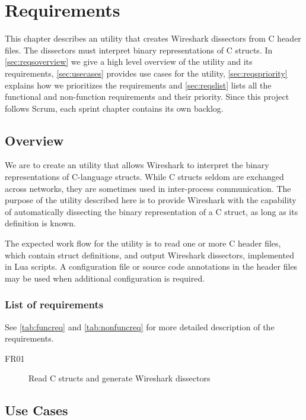 \chapter{Requirements}
\label{chap:requirements}
This chapter describes an utility that creates Wireshark dissectors from C
header files. The dissectors must interpret binary representations of C
structs. In \autoref{sec:reqsoverview} we give a high level overview of the
utility and its requirements, \autoref{sec:usecases} provides use cases for the
utility, \autoref{sec:reqspriority} explains how we prioritizes the
requirements and \autoref{sec:reqslist} lists all the functional and
non-function requirements and their priority. Since this project follows Scrum,
each sprint chapter contains its own backlog.

\section{Overview}
\label{sec:reqsoverview}
We are to create an utility that allows Wireshark to interpret the binary
representations of C-language structs. While C structs seldom are exchanged
across networks, they are sometimes used in inter-process communication. The
purpose of the utility described here is to provide Wireshark with the
capability of automatically dissecting the binary representation of a C struct,
as long as its definition is known.

The expected work flow for the utility is to read one or more C header files,
which contain struct definitions, and output Wireshark dissectors, implemented
in Lua scripts. A configuration file or source code annotations in the header
files may be used when additional configuration is required.

\subsection{List of requirements}
See \autoref{tab:funcreq} and \autoref{tab:nonfuncreq} for more detailed
description of the requirements.

\begin{description}
    \item[FR01] Read C structs and generate Wireshark dissectors
\end{description}

\section{Use Cases}
\label{sec:usecases}

